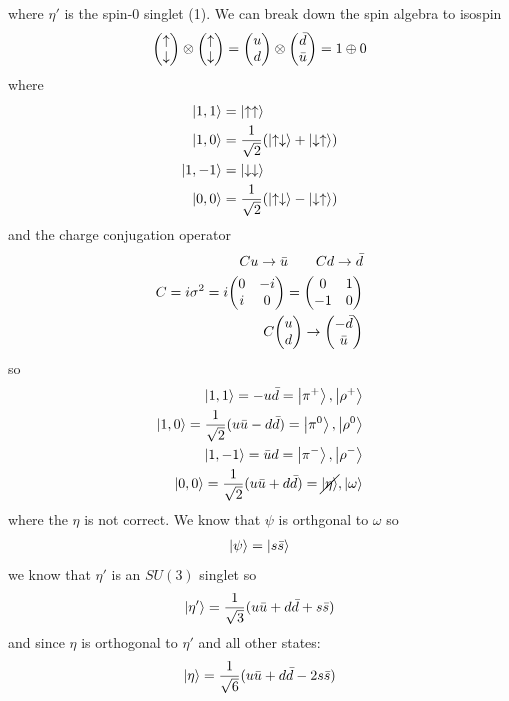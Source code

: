\documentclass[../main.tex]{subfiles}
\begin{document}
where $\eta'$ is the spin-0 singlet (1). We can break down the spin algebra to isospin
\begin{align*}
    \mqty(\uparrow \\ \downarrow) \otimes \mqty(\uparrow \\ \downarrow)
        = \mqty(u \\ d) \otimes \mqty(\bar d \\ \bar u) = 1 \oplus 0
\end{align*}
where
\newcommand{\ua}{\uparrow}
\newcommand{\da}{\downarrow}
\begin{align*}
    \ket{1,1} &= \ket{\ua \ua} \\
    \ket{1,0} &= \frac{1}{\sqrt{2}} (\ket{\ua \da} + \ket{\da \ua}) \\
    \ket{1,-1} &= \ket{\da \da} \\
    \ket{0,0} &= \frac{1}{\sqrt{2}} (\ket{\ua \da} - \ket{\da \ua})
\end{align*}
and the charge conjugation operator
\begin{align*}
    C u \to \bar u \qquad C d \to \bar d \\
    C = i \sigma^2 = i \mqty(0 & -i \\ i & 0) = \mqty(0 & 1 \\ -1 & 0) \\
    C\mqty(u \\ d) \to \mqty(-\bar d \\ \bar u)
\end{align*}
so
\begin{align*}
    \ket{1,1} = -u \bar d = \ket{\pi^+}, \ket{\rho^+} \\
    \ket{1,0} = \frac{1}{\sqrt{2}} (u \bar u - d \bar d) = \ket{\pi^0}, \ket{\rho^0} \\
    \ket{1,-1} = \bar u  d = \ket{\pi^-}, \ket{\rho^-} \\
    \ket{0,0} = \frac{1}{\sqrt{2}} (u \bar u + d \bar d) = \cancel{\ket{\eta}}, \ket{\omega}
\end{align*}
where the $\eta$ is not correct. We know that $\psi$ is orthgonal to $\omega$ so
\begin{align*}
    \ket{\psi} = \ket{s \bar s}
\end{align*}
we know that $\eta'$ is an $SU(3)$ singlet so
\begin{align*}
    \ket{\eta'} = \frac{1}{\sqrt{3}} (u \bar u + d \bar d + s \bar s)
\end{align*}
and since $\eta$ is orthogonal to $\eta'$ and all other states:
\begin{align*}
    \ket{\eta} = \frac{1}{\sqrt{6}} (u \bar u + d \bar d - 2s \bar s)
\end{align*}
\end{document}
